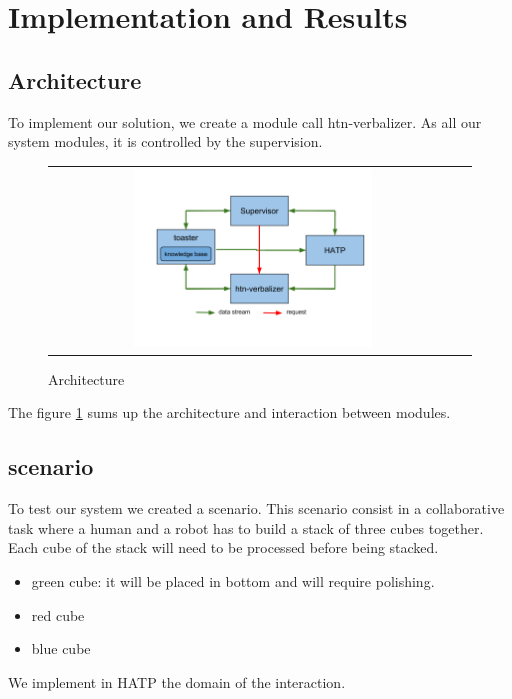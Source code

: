 \documentclass{llncs}
\begin{document}

\section{Implementation and Results}
\subsection{Architecture}
To implement our solution, we create a module call htn-verbalizer. 
As all our system modules, it is controlled by the supervision.

\begin{figure}[ht!]

   \vspace{-12pt}
 \centering
 \begin{tabular}{cc}
  \includegraphics[width=0.6\textwidth]{img/archi.png}
 \end{tabular}
 \caption{Architecture}
 \label{fig:architecture}
   \vspace{-6pt}
 \end{figure}

The figure \ref{fig:architecture}
sums up the architecture and interaction between modules.


\subsection{scenario}
To test our system we created a scenario.
This scenario consist in a collaborative task where a human and a robot has to build a stack of three cubes together. 
Each cube of the stack will need to be processed before being stacked.
\begin{itemize}
\item green cube: it will be placed in bottom and will require polishing.
\item red cube
\item blue cube
\end{itemize}
We implement in HATP the  domain of the interaction.
\end{document}
